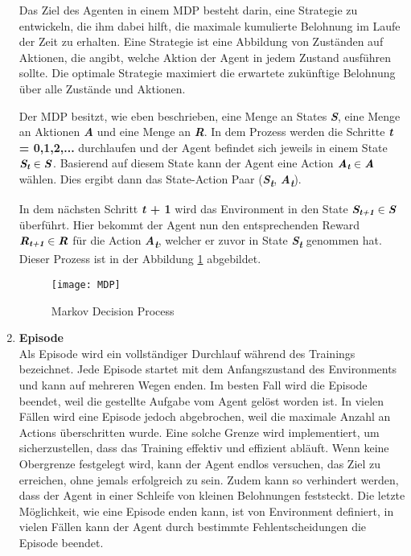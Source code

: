 \begin{enumerate}
    Das Ziel des Agenten in einem MDP besteht darin, eine Strategie zu entwickeln, die ihm dabei hilft, die maximale kumulierte Belohnung im Laufe der Zeit zu erhalten. Eine Strategie ist eine Abbildung von Zuständen auf Aktionen, die angibt, welche Aktion der Agent in jedem Zustand ausführen sollte. Die optimale Strategie maximiert die erwartete zukünftige Belohnung über alle Zustände und Aktionen.
    
    Der MDP besitzt, wie eben beschrieben, eine Menge an States \textbf{\textit{S}}, eine Menge an Aktionen \textbf{\textit{A}} und eine Menge an \textbf{\textit{R}}.
    In dem Prozess werden die Schritte \textbf{\textit{t} = 0,1,2,...} durchlaufen und der Agent befindet sich jeweils in einem State $ \text{\textbf{\textit{S\textsubscript{t}}}}\in \text{\textbf{\textit{S}}}$. 
    Basierend auf diesem State kann der Agent eine Action $ \text{\textbf{\textit{A\textsubscript{t}}}}\in \text{\textbf{\textit{A}}}$ wählen. Dies ergibt dann das State-Action Paar (\textbf{\textit{S\textsubscript{t}}}, \textbf{\textit{A\textsubscript{t}}}).

    In dem nächsten Schritt \textbf{\textit{t} + 1} wird das Environment in den State $ \text{\textbf{\textit{S\textsubscript{t+1}}}}\in \text{\textbf{\textit{S}}}$ überführt.
    Hier bekommt der Agent nun den entsprechenden Reward $ \text{\textbf{\textit{R\textsubscript{t+1}}}}\in \text{\textbf{\textit{R}}}$ für die Action \textbf{\textit{A\textsubscript{t}}},
    welcher er zuvor in State \textbf{\textit{S\textsubscript{t}}} genommen hat. Dieser Prozess ist in der Abbildung \ref{MDP} abgebildet.


    \begin{figure}
        \texttt{[image: MDP]}
        \caption{Markov Decision Process}
        \label{MDP}
    \end{figure}
    \item \label{itm:Episode} \textbf{Episode} \\
    Als Episode \cite{lesswrongWhatTraining} wird ein vollständiger Durchlauf während des Trainings bezeichnet. Jede Episode startet mit dem Anfangszustand des Environments und kann auf mehreren Wegen enden. Im besten Fall wird die Episode beendet, weil die gestellte Aufgabe vom Agent gelöst worden ist. In vielen Fällen wird eine Episode jedoch abgebrochen, weil die maximale Anzahl an Actions überschritten wurde. Eine solche Grenze wird implementiert, um sicherzustellen, dass das Training effektiv und effizient abläuft. Wenn keine Obergrenze festgelegt wird, kann der Agent endlos versuchen, das Ziel zu erreichen, ohne jemals erfolgreich zu sein. Zudem kann so verhindert werden, dass der Agent in einer Schleife von kleinen Belohnungen feststeckt. Die letzte Möglichkeit, wie eine Episode enden kann, ist von Environment definiert, in vielen Fällen kann der Agent durch bestimmte Fehlentscheidungen die Episode beendet.
    

\end{enumerate}
